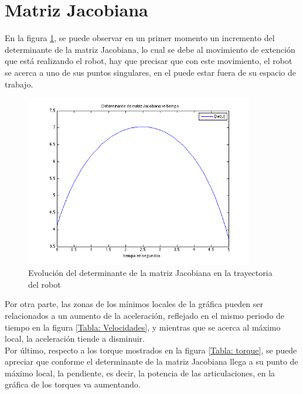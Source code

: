 \documentclass[11pt]{report} %
\begin{document}
	\section{Matriz Jacobiana}

	En la figura \ref{Figura: Jacobiano}, se puede observar en un primer momento un incremento del determinante de la matriz Jacobiana, lo cual se debe al movimiento de extención que está realizando el robot, hay que precisar que con este movimiento, el robot se acerca a uno de sus puntos singulares, en el puede estar fuera de su espacio de trabajo.

	\begin{figure}[H]
		\centering
		\includegraphics[width=10cm]{Imagenes/detJ.png}
		\caption{Evolución del determinante de la matriz Jacobiana en la trayectoria del robot}
		\label{Figura: Jacobiano}
	\end{figure}

	Por otra parte, las zonas de los mínimos locales de la gráfica pueden ser relacionados a un aumento de la aceleración, reflejado en el mismo periodo de tiempo en la figura \ref{Tabla: Velocidades}, y mientras que se acerca al máximo local, la aceleración tiende a disminuir.\\

	Por último, respecto a los torque mostrados en la figura \ref{Tabla: torque}, se puede apreciar que conforme el determinante de la matriz Jacobiana llega a su punto de máximo local, la pendiente, es decir, la potencia de las articulaciones, en la gráfica de los torques va aumentando.

	
	
\end{document}
